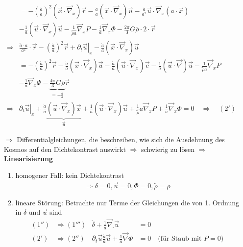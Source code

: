 \begin{itemize}
\begin{align*}
			&=-\left(\frac{\dot{a}}{a}\right)^2\left(\vec{x}\cdot\vec{\nabla}_x\right)\vec{r}-\frac{\dot{a}}{a}\left(\vec{x}\cdot\vec{\nabla}_x\right)\vec{u}-\frac{\dot{a}}{a^2}\vec{u}\cdot\vec{\nabla}_x(a\cdot\vec{x})\\
			&-\frac{1}{a}\left(\vec{u}\cdot\vec{\nabla}_x\right)\vec{u} -\frac{1}{\tilde{\rho}a}\vec{\nabla}_xP-\frac{1}{a}\vec{\nabla}_x\Phi-\frac{2\pi}{3}G\bar{\rho}\cdot 2\cdot\vec{r}\\
			\Rightarrow &\frac{\ddot{a}\cdot a}{a^2}\cdot\vec{r}-\left(\frac{\dot{a}}{a}\right)^2\vec{r}+\left.\partial_t\vec{u}\right|_x-\frac{\dot{a}}{a}\left(\vec{x}\cdot\vec{\nabla}_x\right)\vec{u}\\
			&=-\left(\frac{\dot{a}}{a}\right)^2\vec{r}-\frac{\dot{a}}{a}\left(\vec{x}\cdot\vec{\nabla}_x\right)\vec{u}-\frac{\dot{a}}{a}\left(\vec{u}\cdot\vec{\nabla}_x\right)\vec{c}-\frac{1}{a}\left(\vec{u}\cdot\vec{\nabla}\right)\vec{u}-\frac{1}{\tilde{\rho}a}\vec{\nabla}_x P\\
			&-\frac{1}{a}\vec{\nabla}_x\Phi-\underset{=-\frac{\ddot{a}}{a}}{\underbrace{\frac{4\pi}{3}G\bar{\rho}}}\vec{r}\\
			\Rightarrow &\left.\partial_t\vec{u}\right|_x+\frac{\dot{a}}{a}\underset{\vec{u}}{\underbrace{\left(\vec{u}\cdot\vec{\nabla}_x\right)\vec{x}}}+\frac{1}{a}\left(\vec{u}\cdot\vec{\nabla}_x\right)\vec{u}+\frac{1}{\tilde{\rho}}a\vec{\nabla}_xP+\frac{1}{a}\vec{\nabla}_x\Phi=0 \quad \Rightarrow \quad (2')
		\end{align*}
	\item[$\Rightarrow$] Differentialgleichungen, die beschreiben, wie sich die Ausdehnung des Kosmos auf den Dichtekontrast auswirkt $\Rightarrow$ schwierig zu lösen $\Rightarrow$ \textbf{Linearisierung}
		\begin{enumerate}[label={(\alph*)}]
			\item homogener Fall: kein Dichtekontrast
				\begin{align*}
					\Rightarrow \delta=0, \vec{u}=0, \Phi=0, \tilde{\rho}=\bar{\rho}
				\end{align*}
			\item lineare Störung: Betrachte nur Terme der Gleichungen die von 1. Ordnung in $\delta$ und $\vec{u}$ sind
				\begin{align*}
					(1'')&\Rightarrow (1''') & \dot{\delta}+\frac{1}{a}\vec{\nabla}_\cdot\vec{u}&=0\\
					(2')&\Rightarrow (2'') & \partial_t\vec{u}\frac{\dot{a}}{a}\vec{u}+\frac{1}{a}\vec{\nabla}\Phi&=0 \quad \text{(für Staub mit $P=0$)}\\

\end{align*}
\end{enumerate}
\end{itemize}
